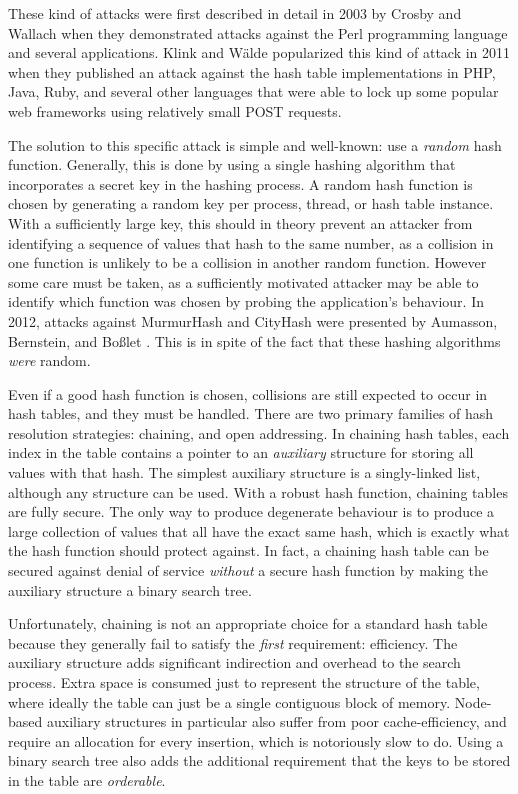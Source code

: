\documentclass{cccg13}
\begin{document}
These kind of attacks were first described in detail in 2003 by Crosby and Wallach \cite{perl-dos} when they demonstrated attacks against the Perl programming language and several applications. Klink and Wälde \cite{web-dos} popularized this kind of attack in 2011 when they published an attack against the hash table implementations in PHP, Java, Ruby, and several other languages that were able to lock up some popular web frameworks using relatively small POST requests.

The solution to this specific attack is simple and well-known: use a \emph{random} hash function.  Generally, this is done by using a single hashing algorithm that incorporates a secret key in the hashing process. A random hash function is chosen by generating a random key per process, thread, or hash table instance. With a sufficiently large key, this should in theory prevent an attacker from identifying a sequence of values that hash to the same number, as a collision in one function is unlikely to be a collision in another random function. However some care must be taken, as a sufficiently motivated attacker may be able to identify which function was chosen by probing the application's behaviour. In 2012, attacks against MurmurHash and CityHash were presented by Aumasson, Bernstein, and Boßlet \cite{murmur-dos}. This is in spite of the fact that these hashing algorithms \emph{were} random.

Even if a good hash function is chosen, collisions are still expected to occur in hash tables, and they must be handled. There are two primary families of hash resolution strategies: chaining, and open addressing. In chaining hash tables, each index in the table contains a pointer to an \emph{auxiliary} structure for storing all values with that hash. The simplest auxiliary structure is a singly-linked list, although any structure can be used. With a robust hash function, chaining tables are fully secure. The only way to produce degenerate behaviour is to produce a large collection of values that all have the exact same hash, which is exactly what the hash function should protect against. In fact, a chaining hash table can be secured against denial of service \emph{without} a secure hash function by making the auxiliary structure a binary search tree.

Unfortunately, chaining is not an appropriate choice for a standard hash table because they generally fail to satisfy the \emph{first} requirement: efficiency. The auxiliary structure adds significant indirection and overhead to the search process. Extra space is consumed just to represent the structure of the table, where ideally the table can just be a single contiguous block of memory. Node-based auxiliary structures in particular also suffer from poor cache-efficiency, and require an allocation for every insertion, which is notoriously slow to do. Using a binary search tree also adds the additional requirement that the keys to be stored in the table are \emph{orderable}.
\end{document}
